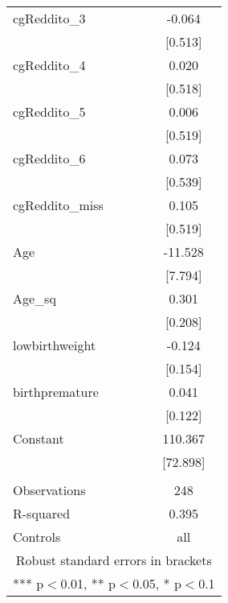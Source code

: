 \documentclass[]{article}
\begin{document}
\begin{tabular}{lc}
cgReddito\_3 & -0.064 \\
 & [0.513] \\
cgReddito\_4 & 0.020 \\
 & [0.518] \\
cgReddito\_5 & 0.006 \\
 & [0.519] \\
cgReddito\_6 & 0.073 \\
 & [0.539] \\
cgReddito\_miss & 0.105 \\
 & [0.519] \\
Age & -11.528 \\
 & [7.794] \\
Age\_sq & 0.301 \\
 & [0.208] \\
lowbirthweight & -0.124 \\
 & [0.154] \\
birthpremature & 0.041 \\
 & [0.122] \\
Constant & 110.367 \\
 & [72.898] \\
 &  \\
Observations & 248 \\
R-squared & 0.395 \\
 Controls & all \\ \hline
\multicolumn{2}{c}{ Robust standard errors in brackets} \\
\multicolumn{2}{c}{ *** p$<$0.01, ** p$<$0.05, * p$<$0.1} \\
\end{tabular}
\end{document}
